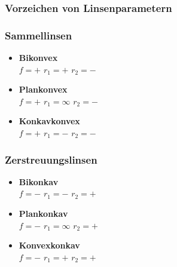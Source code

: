 \documentclass[a4paper,10pt]{article}
\begin{document}
\subsubsection{Vorzeichen von Linsenparametern}
\begin{framed}
\begin{minipage}[t]{0.48\textwidth}
	\subsubsection*{Sammellinsen}
	\begin{itemize}
		\item \textbf{Bikonvex} \\
		$f = +$ \hspace{5mm} $r_1 = +$ \hspace{5mm} $r_2 = -$
		
		\item \textbf{Plankonvex} \\
		$f = +$ \hspace{5mm} $r_1 = \infty$ \hspace{5mm} $r_2 = -$
		
		\item \textbf{Konkavkonvex} \\
		$f = +$ \hspace{5mm} $r_1 = -$ \hspace{5mm} $r_2 = -$
	\end{itemize}
\end{minipage}
\hfill
\begin{minipage}[t]{0.48\textwidth}
	\subsubsection*{Zerstreuungslinsen}
	\begin{itemize}
		\item \textbf{Bikonkav} \\
		$f = -$ \hspace{5mm} $r_1 = -$ \hspace{5mm} $r_2 = +$
		
		\item \textbf{Plankonkav} \\
		$f = -$ \hspace{5mm} $r_1 = \infty$ \hspace{5mm} $r_2 = +$
		
		\item \textbf{Konvexkonkav} \\
		$f = -$ \hspace{5mm} $r_1 = +$ \hspace{5mm} $r_2 = +$
	\end{itemize}
\end{minipage}

\end{framed}
\end{document}
